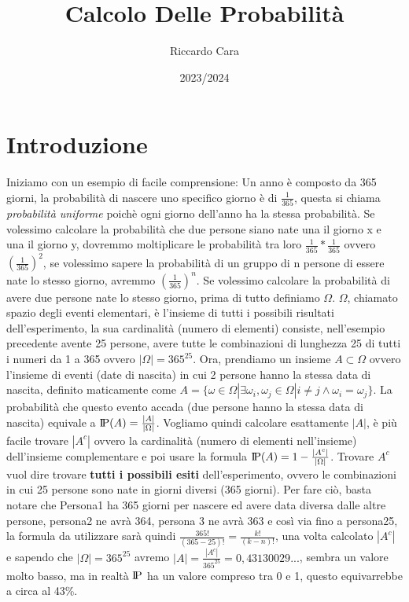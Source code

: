 \documentclass{article}
\title{Calcolo Delle Probabilità}
\author{Riccardo Cara}
\date{2023/2024}
\newcommand{\probP}{\text{I\kern-0.15em P}}
\begin{document}
\maketitle
\tableofcontents
\newpage
\section{Introduzione}
Iniziamo con un esempio di facile comprensione:
Un anno è composto da 365 giorni, la probabilità di nascere uno specifico giorno è di $\frac{1}{365}$, questa si chiama \textit{probabilità uniforme} poichè ogni giorno dell'anno ha la stessa probabilità.
Se volessimo calcolare la probabilità che due persone siano nate una il giorno x e una il giorno y, dovremmo moltiplicare le probabilità tra loro $\frac{1}{365}*\frac{1}{365}$ ovvero $(\frac{1}{365})^2$, se volessimo sapere la probabilità di un gruppo di n persone di essere nate lo stesso giorno, avremmo $(\frac{1}{365})^n$.
Se volessimo calcolare la probabilità di avere due persone nate lo stesso giorno, prima di tutto definiamo $\Omega$.
$\Omega$, chiamato spazio degli eventi elementari, è l'insieme di tutti i possibili risultati dell'esperimento, la sua cardinalità (numero di elementi) consiste, nell'esempio precedente avente 25 persone, avere tutte le combinazioni di lunghezza 25 di tutti i numeri da 1 a 365 ovvero $|\Omega| = 365^{25}$.
Ora, prendiamo un insieme $A \subset \Omega$ ovvero l'insieme di eventi (date di nascita) in cui 2 persone hanno la stessa data di nascita, definito maticamente come $A=\{\omega \in \Omega |\exists \omega_i,\omega_j \in \Omega | i\neq j\land \omega_i = \omega_j\}$. La probabilità che questo evento accada (due persone hanno la stessa data di nascita) equivale a $\probP(A)=\frac{|A|}{|\Omega|}$.
Vogliamo quindi calcolare esattamente $|A|$, è più facile trovare $|A^c|$ ovvero la cardinalità (numero di elementi nell'insieme) dell'insieme complementare e poi usare la formula $\probP(A)=1-\frac{|A^c|}{|\Omega|}$.
Trovare $A^c$ vuol dire trovare \textbf{tutti i possibili esiti} dell'esperimento, ovvero le combinazioni in cui 25 persone sono nate in giorni diversi (365 giorni). Per fare ciò, basta notare che Persona1 ha 365 giorni per nascere ed avere data diversa dalle altre persone, persona2 ne avrà 364, persona 3 ne avrà 363 e così via fino a persona25, la formula da utilizzare sarà quindi $\frac{365!}{(365-25)!}=\frac{k!}{(k-n)!}$, una volta calcolato $|A^c|$ e sapendo che $|\Omega|=365^{25}$ avremo $|A|=\frac{|A^c|}{365^{25}} =0,43130029...$, sembra un valore molto basso, ma in realtà $\probP$ ha un valore compreso tra 0 e 1, questo equivarrebbe a circa al 43\%.
\end{document}

